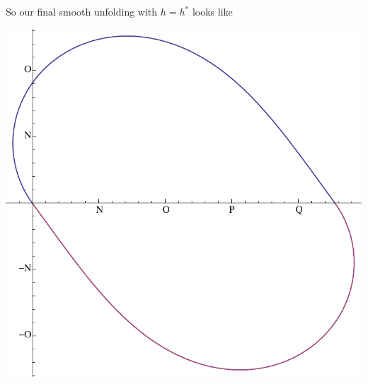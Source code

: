 \documentclass[12pt]{article}
\begin{document}
So our final smooth unfolding with $h=h^*$ looks like
\begin{center}
\includegraphics[scale=.4]{unfold_h=h*.pdf}
\end{center}
\end{document}
